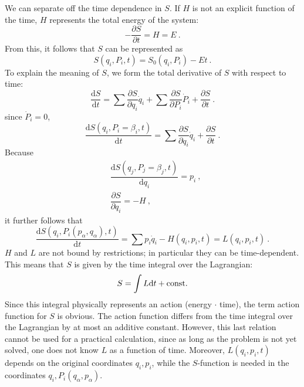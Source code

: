 \documentclass[11pt,a4paper]{article}
\newcommand{\dif}{\mathrm{d}}
\begin{document}
We can separate off the time dependence in $S$. If $H$ is not an explicit function of the time, $H$ represents the total energy of the system:
\begin{equation}
-\dfrac{\partial S}{\partial t} = H = E ~.
\end{equation}
From this, it follows that $S$ can be represented as
\begin{equation}
S(q_i, P_i, t) = S_0(q_i, P_i) -Et ~.
\end{equation}
To explain the meaning of $S$, we form the total derivative of $S$ with respect to time:
\begin{equation*}
\dfrac{\dif S}{\dif t} = \sum \dfrac{\partial S}{\partial q_i} \dot{q}_i +\sum \dfrac{\partial S}{\partial P_i} \dot{P}_i +\dfrac{\partial S}{\partial t} ~.
\end{equation*}
since $\dot{P}_i = 0$, 
\begin{equation*}
\dfrac{\dif S(q_i, P_i =\beta_i, t)}{\dif t} = \sum \dfrac{\partial S}{\partial q_i} \dot{q}_i +\dfrac{\partial S}{\partial t} ~.
\end{equation*}
Because
\begin{align*}
& \dfrac{\dif S(q_j, P_j =\beta_j, t)}{\dif q_i} = p_i ~, \\
& \dfrac{\partial S}{\partial q_i} = -H ~,
\end{align*}
it further follows that
\begin{equation}
\dfrac{\dif S(q_i, P_i(p_\alpha, q_\alpha), t)}{\dif t} = \sum p_i \dot{q}_i -H(q_i, p_i, t) = L(q_i, p_i, t) ~.
\end{equation}
$H$ and $L$ are not bound by restrictions; in particular they can be time-dependent. This means that $S$ is given by the time integral over the Lagrangian:
\begin{equation}
S = \int L \dif t + \rm const.
\end{equation}
Since this integral physically represents an action (energy $\cdot$ time), the term action function for $S$ is obvious. The action function differs from the time integral over the Lagrangian by at most an additive constant. However, this last relation cannot be used for a practical calculation, since as long as the problem is not yet solved, one does not know $L$ as a function of time. Moreover, $L(q_i, p_i, t)$ depends on the original coordinates $q_i, p_i$, while the $S$-function is needed in the coordinates $q_i, P_i(q_\alpha, p_\alpha)$.
\end{document}
